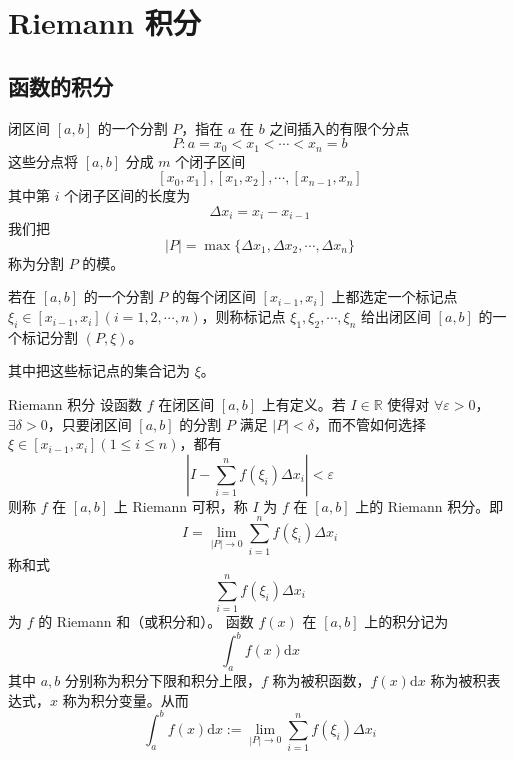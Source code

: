\chapter{Riemann 积分}


\section{函数的积分}

\begin{definition}
    闭区间 $[a,b]$ 的一个分割 $P$，指在 $a$ 在 $b$ 之间插入的有限个分点
    \[P : a = x_0 < x_1 < \cdots < x_n = b\]
    这些分点将 $[a,b]$ 分成 $m$ 个闭子区间
    \[[x_0,x_1],[x_1,x_2],\cdots,[x_{n -1},x_n]\]
    其中第 $i$ 个闭子区间的长度为
    \[\Delta x_i = x_i - x_{i - 1}\]
    我们把
    \[|P| = \max\{\Delta x_1,\Delta x_2,\cdots,\Delta x_n\}\]
    称为分割 $P$ 的模。
\end{definition}

\begin{definition}
    若在 $[a,b]$ 的一个分割 $P$ 的每个闭区间 $[x_{i - 1}, x_i]$ 上都选定一个标记点 $\xi_i \in [x_{i -1}, x_i](i = 1,2,\cdots,n)$，则称标记点 $\xi_1,\xi_2,\cdots,\xi_n$ 给出闭区间 $[a,b]$ 的一个标记分割 $(P,\xi)$。

    其中把这些标记点的集合记为 $\xi$。
\end{definition}

\begin{definition}{Riemann 积分}
    设函数 $f$ 在闭区间 $[a,b]$ 上有定义。若 $I \in \mathbb{R}$ 使得对 $\forall \varepsilon > 0$，$\exists \delta > 0$，只要闭区间 $[a,b]$ 的分割 $P$ 满足 $|P| < \delta$，而不管如何选择 $\xi \in [x_{i - 1}, x_i](1 \leqslant i \leqslant n)$，都有
    \[|I - \sum_{i =1}^{n}f(\xi_i)\Delta x_i| < \varepsilon\]
    则称 $f$ 在 $[a,b]$ 上 Riemann 可积，称 $I$ 为 $f$ 在 $[a,b]$ 上的 Riemann 积分。即
    \[I = \lim_{|P| \to 0}\sum_{i = 1}^{n}f(\xi_i)\Delta x_i\]
    称和式
    \[\sum_{i = 1}^{n}f(\xi_i)\Delta x_i\]
    为 $f$ 的 Riemann 和（或积分和）。
    函数 $f(x)$ 在 $[a,b]$ 上的积分记为
    \[\int_a^b f(x)\mathrm{d}x\]
    其中 $a,b$ 分别称为积分下限和积分上限，$f$ 称为被积函数，$f(x)\mathrm{d}x$ 称为被积表达式，$x$ 称为积分变量。从而
    \[\int_a^b f(x)\mathrm{d}x := \lim_{|P| \to 0}\sum_{i = 1}^{n}f(\xi_i)\Delta x_i\]
\end{definition}

